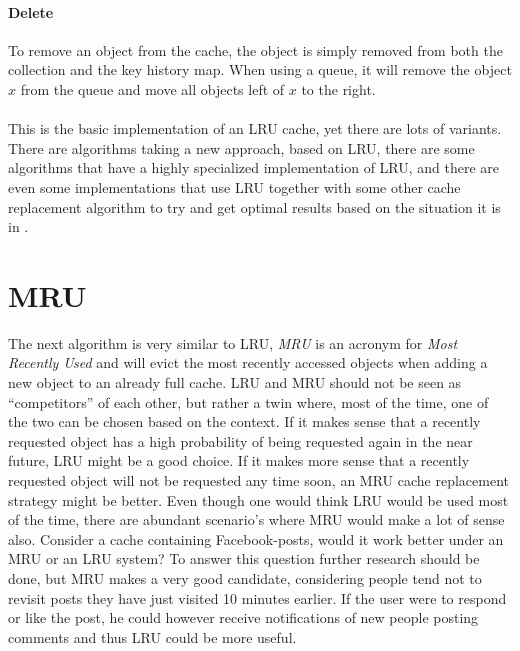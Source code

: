 \documentclass[pdftex,a4paper,12pt,twoside]{report}
\begin{document}
\paragraph{Delete} To remove an object from the cache, the object is simply removed from both the collection and the key history map. When using a queue, it will remove the object $x$ from the queue and move all objects left of $x$ to the right.
\\\\
This is the basic implementation of an LRU cache, yet there are lots of variants. There are algorithms taking a new approach, based on LRU, there are some algorithms that have a highly specialized implementation of LRU, and there are even some implementations that use LRU together with some other cache replacement algorithm to try and get optimal results based on the situation it is in \citep{lru_implementation}.
\section{MRU}
The next algorithm is very similar to LRU, \emph{MRU} is an acronym for \emph{Most Recently Used} and will evict the most recently accessed objects when adding a new object to an already full cache. LRU and MRU should not be seen as ``competitors'' of each other, but rather a twin where, most of the time, one of the two can be chosen based on the context.
If it makes sense that a recently requested object has a high probability of being requested again in the near future, LRU might be a good choice. If it makes more sense that a recently requested object will not be requested any time soon, an MRU cache replacement strategy might be better. Even though one would think LRU would be used most of the time, there are abundant scenario's where MRU would make a lot of sense also. Consider a cache containing Facebook-posts, would it work better under an MRU or an LRU system? To answer this question further research should be done, but MRU makes a very good candidate, considering people tend not to revisit posts they have just visited 10 minutes earlier. If the user were to respond or like the post, he could however receive notifications of new people posting comments and thus LRU could be more useful.
\end{document}
